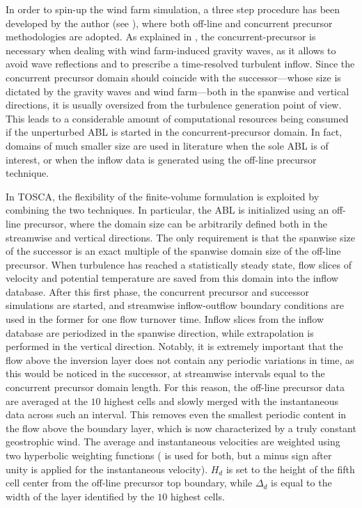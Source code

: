In order to spin-up the wind farm simulation, a three step procedure has been developed by the author (see ), where both off-line and concurrent precursor methodologies are adopted. As explained in , the concurrent-precursor is necessary when dealing with wind farm-induced gravity waves, as it allows to avoid wave reflections and to prescribe a time-resolved turbulent inflow. Since the concurrent precursor domain should coincide with the successor---whose size is dictated by the gravity waves and wind farm---both in the spanwise and vertical directions, it is usually oversized from the turbulence generation point of view. This leads to a considerable amount of computational resources being consumed if the unperturbed ABL is started in the concurrent-precursor domain. In fact, domains of much smaller size are used in literature when the sole ABL is of interest, or when the inflow data is generated using the off-line precursor technique. 

In TOSCA, the flexibility of the finite-volume formulation is exploited by combining the two techniques. In particular, the ABL is initialized using an off-line precursor, where the domain size can be arbitrarily defined both in the streamwise and vertical directions. The only requirement is that the spanwise size of the successor is an exact multiple of the spanwise domain size of the off-line precursor. When turbulence has reached a statistically steady state, flow slices of velocity and potential temperature are saved from this domain into the inflow database. After this first phase, the concurrent precursor and successor simulations are started, and streamwise inflow-outflow boundary conditions are used in the former for one flow turnover time. Inflow slices from the inflow database are periodized in the spanwise direction, while extrapolation is performed in the vertical direction. Notably, it is extremely important that the flow above the inversion layer does not contain any periodic variations in time, as this would be noticed in the successor, at streamwise intervals equal to the concurrent precursor domain length. For this reason, the off-line precursor data are averaged at the $10$ highest cells and slowly merged with the instantaneous data across such an interval. This removes even the smallest periodic content in the flow above the boundary layer, which is now characterized by a truly constant geostrophic wind. The average and instantaneous velocities are weighted using two hyperbolic weighting functions ( is used for both, but a minus sign after unity is applied for the instantaneous velocity). $H_d$ is set to the height of the fifth cell center from the off-line precursor top boundary, while $\Delta_d$ is equal to the width of the layer identified by the $10$ highest cells. 

